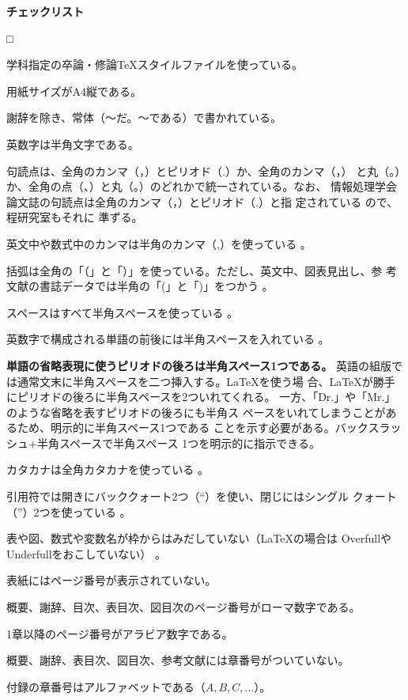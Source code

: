 \documentclass[11pt,a4j]{jsarticle}
\begin{document}
\begin{flushleft}
 {\bf チェックリスト}
\end{flushleft}
\begin{list}%
 {□} %
 {} %
 \item 学科指定の卒論・修論TeXスタイルファイルを使っている。
 \item 用紙サイズがA4縦である。
 \item 謝辞を除き、常体（〜だ。〜である）で書かれている。
 \item 英数字は半角文字である。
 \item 句読点は、全角のカンマ（，）とピリオド（.）か、全角のカンマ（，）
       と丸（。）か、全角の点（、）と丸（。）のどれかで統一されている。なお、
       情報処理学会論文誌の句読点は全角のカンマ（，）とピリオド（.）と指
       定されている \cite{IPSJ_HowToWrite_ver7.1} ので、程研究室もそれに
       準ずる。
 \item 英文中や数式中のカンマは半角のカンマ（,）を使っている
       \cite{IPSJ_HowToWrite_ver7.1}。
 \item 括弧は全角の「（」と「）」を使っている。ただし、英文中、図表見出し、参
       考文献の書誌データでは半角の「(」と「)」をつかう
       \cite{IPSJ_HowToWrite_ver7.1}。
 \item スペースはすべて半角スペースを使っている
       \cite{IPSJ_HowToWrite_ver7.1}。
 \item 英数字で構成される単語の前後には半角スペースを入れている
       \cite{IPSJ_HowToWrite_ver7.1}。
 \item {\bf 単語の省略表現に使うピリオドの後ろは半角スペース1つである。}
       英語の組版では通常文末に半角スペースを二つ挿入する。LaTeXを使う場
       合、LaTeXが勝手にピリオドの後ろに半角スペースを2ついれてくれる。
       一方、「Dr.」や「Mr.」のような省略を表すピリオドの後ろにも半角ス
       ペースをいれてしまうことがあるため、明示的に半角スペース1つである
       ことを示す必要がある。バックスラッシュ+半角スペースで半角スペース
       1つを明示的に指示できる。
 \item カタカナは全角カタカナを使っている \cite{IPSJ_HowToWrite_ver7.1}。
 \item 引用符では開きにバッククォート2つ（``）を使い、閉じにはシングル
       クォート（''）2つを使っている \cite{IPSJ_HowToWrite_ver7.1}。
 \item 表や図、数式や変数名が枠からはみだしていない（LaTeXの場合は
       OverfullやUnderfullをおこしていない）
       \cite{IPSJ_HowToWrite_ver7.1}。
 \item 表紙にはページ番号が表示されていない。
 \item 概要、謝辞、目次、表目次、図目次のページ番号がローマ数字である。
 \item 1章以降のページ番号がアラビア数字である。
 \item 概要、謝辞、表目次、図目次、参考文献には章番号がついていない。
 \item 付録の章番号はアルファベットである（$A, B, C, \ldots$）。
\end{list}
\end{document}
